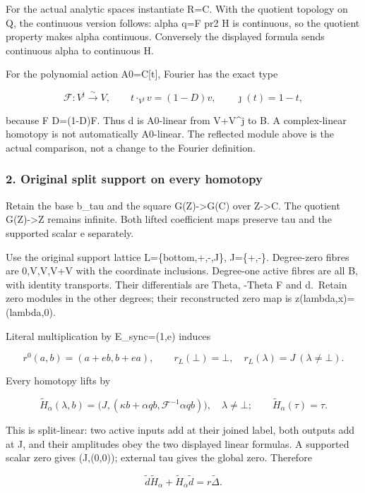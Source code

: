 For the actual analytic spaces instantiate R=C. With the quotient topology on Q, the continuous
version follows: alpha q=F pr2 H is continuous, so the quotient property makes alpha continuous.
Conversely the displayed formula sends continuous alpha to continuous H.

For the polynomial action A0=C{[}t{]}, Fourier has the exact type

\[\mathcal F:V^{\jmath}\xrightarrow{\sim}V,\qquad t\cdot_{V^\jmath}v=(1-D)v,\qquad\jmath(t)=1-t,\]

because F D=(1-D)F. Thus d is A0-linear from V+V\^{}j to B. A complex-linear homotopy is not
automatically A0-linear. The reflected module above is the actual comparison, not a change to the
Fourier definition.

\subsubsection{2. Original split support on every
homotopy}\label{pr_11:original-split-support-on-every-homotopy}

Retain the base b\_tau and the square G(Z)-\textgreater G(C) over Z-\textgreater C. The quotient
G(Z)-\textgreater Z remains infinite. Both lifted coefficient maps preserve tau and the supported
scalar e separately.

Use the original support lattice L=\{bottom,+,-,J\}, J=\{+,-\}. Degree-zero fibres are 0,V,V,V+V
with the coordinate inclusions. Degree-one active fibres are all B, with identity transports. Their
differentials are Theta, -Theta F and d.~Retain zero modules in the other degrees; their
reconstructed zero map is z(lambda,x)=(lambda,0).

Literal multiplication by E\_sync=(1,e) induces

\[r^0(a,b)=(a+eb,b+ea),\qquad r_L(\bot)=\bot,\quad r_L(\lambda)=J\ (\lambda\ne\bot).\]

Every homotopy lifts by

\[\widetilde H_\alpha(\lambda,b)=\bigl(J,(\kappa b+\alpha qb,\mathcal F^{-1}\alpha qb)\bigr),\quad\lambda\ne\bot;\qquad\widetilde H_\alpha(\tau)=\tau.\]

This is split-linear: two active inputs add at their joined label, both outputs add at J, and their
amplitudes obey the two displayed linear formulas. A supported scalar zero gives (J,(0,0)); external
tau gives the global zero. Therefore

\[\widetilde d\widetilde H_\alpha+\widetilde H_\alpha\widetilde d=r\widetilde\Delta.\]

